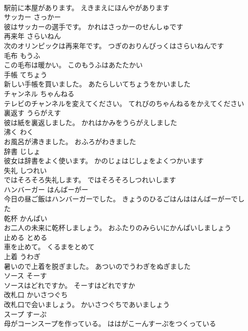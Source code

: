 \documentclass[8pt]{extreport}
\begin{document}
\begin{CJK}{UTF8}{min}
\\	駅前に本屋があります。	えきまえにほんやがあります	
\\	サッカー	さっかー	
\\	彼はサッカーの選手です。	かれはさっかーのせんしゅです	
\\	再来年	さらいねん	
\\	次のオリンピックは再来年です。	つぎのおりんぴっくはさらいねんです	
\\	毛布	もうふ	
\\	この毛布は暖かい。	このもうふはあたたかい	
\\	手帳	てちょう	
\\	新しい手帳を買いました。	あたらしいてちょうをかいました	
\\	チャンネル	ちゃんねる	
\\	テレビのチャンネルを変えてください。	てれびのちゃんねるをかえてください	
\\	裏返す	うらがえす	
\\	彼は紙を裏返しました。	かれはかみをうらがえしました	
\\	沸く	わく	
\\	お風呂が沸きました。	おふろがわきました	
\\	辞書	じしょ	
\\	彼女は辞書をよく使います。	かのじょはじしょをよくつかいます	
\\	失礼	しつれい	
\\	ではそろそろ失礼します。	ではそろそろしつれいします	
\\	ハンバーガー	はんばーがー	
\\	今日の昼ご飯はハンバーガーでした。	きょうのひるごはんははんばーがーでした	
\\	乾杯	かんぱい	
\\	お二人の未来に乾杯しましょう。	おふたりのみらいにかんぱいしましょう	
\\	止める	とめる	
\\	車を止めて。	くるまをとめて	
\\	上着	うわぎ	
\\	暑いので上着を脱ぎました。	あついのでうわぎをぬぎました	
\\	ソース	そーす	
\\	ソースはどれですか。	そーすはどれですか	
\\	改札口	かいさつぐち	
\\	改札口で会いましょう。	かいさつぐちであいましょう	
\\	スープ	すーぷ	
\\	母がコーンスープを作っている。	ははがこーんすーぷをつくっている	

\end{CJK}
\end{document}

